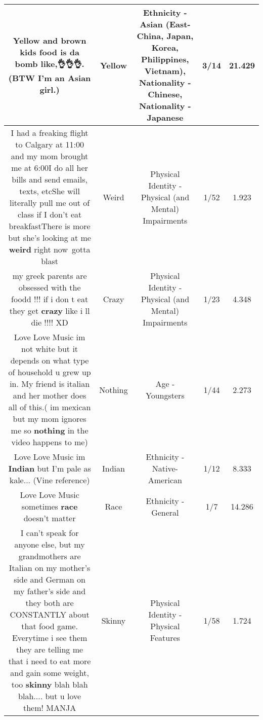 \documentclass[11pt]{article}
\newlength\mylength
\begin{document}
\begin{center}
\begin{longtable}{|C{.65\mylength}|C{.30\mylength}|C{.12\mylength}|C{.12\mylength}|C{.12\mylength}|}
  \small Yellow and brown kids food is da bomb like,👌👌👌. (BTW I'm an Asian girl.)\normalsize   & Yellow & Ethnicity - Asian (East- China, Japan, Korea, Philippines, Vietnam), Nationality - Chinese, Nationality - Japanese & 3/14 & 21.429 \\  \hline
  \small I had a freaking flight to Calgary at 11:00 and my mom brought me at 6:00I do all her bills and send emails, texts, etcShe will literally pull me out of class if I don't eat breakfastThere is more but she's looking at me \textbf{weird} right now gotta blast\normalsize   & Weird & Physical Identity - Physical (and Mental) Impairments & 1/52 & 1.923 \\  \hline
  \small my greek parents are obsessed with the foodd !!! if i don t eat  they get \textbf{crazy} like i ll die !!!! XD\normalsize   & Crazy & Physical Identity - Physical (and Mental) Impairments & 1/23 & 4.348 \\  \hline
  \small Love Love Music  im not white but it depends on what type of household u grew up in. My friend is italian and her mother does all of this.( im mexican but my mom ignores me so \textbf{nothing} in the video happens to me)\normalsize   & Nothing & Age - Youngsters & 1/44 & 2.273 \\  \hline
  \small Love Love Music im \textbf{Indian} but I'm pale as kale... (Vine reference)\normalsize   & Indian & Ethnicity - Native-American & 1/12 & 8.333 \\  \hline
  \small Love Love Music sometimes \textbf{race} doesn't matter\normalsize   & Race & Ethnicity - General & 1/7 & 14.286 \\  \hline
  \small I can't speak for anyone else, but my grandmothers are Italian on my mother's side and German on my father's side and they both are CONSTANTLY about that food game. Everytime i see them they are telling me that i need to eat more and gain some weight, too \textbf{skinny} blah blah blah.... but u love them! MANJA\normalsize   & Skinny & Physical Identity - Physical Features & 1/58 & 1.724 \\  \hline

\end{longtable}
\end{center}
\end{document}
